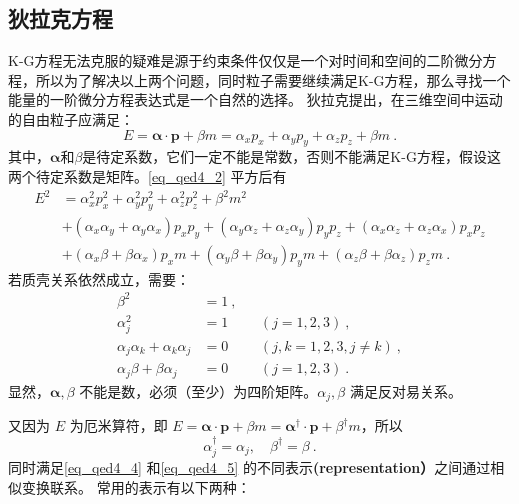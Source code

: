 \subsection{狄拉克方程}
K-G方程无法克服的疑难是源于约束条件仅仅是一个对时间和空间的二阶微分方程，所以为了解决以上两个问题，同时粒子需要继续满足K-G方程，那么寻找一个能量的一阶微分方程表达式是一个自然的选择。
狄拉克提出，在三维空间中运动的自由粒子应满足：
\begin{equation}\label{eq_qed4_2}
E=\boldsymbol{\alpha} \cdot \boldsymbol{p}+\beta m=\alpha_{x} p_{x}+\alpha_{y} p_{y}+\alpha_{z} p_{z}+\beta m~.
\end{equation}
其中，$\boldsymbol {\alpha}$和$\beta$是待定系数，它们一定不能是常数，否则不能满足K-G方程，假设这两个待定系数是矩阵。\autoref{eq_qed4_2} 平方后有
\begin{equation}\label{eq_qed4_3}
\begin{aligned}
E^{2} &=\alpha_{x}^{2} p_{x}^{2}+\alpha_{y}^{2} p_{y}^{2}+\alpha_{z}^{2} p_{z}^{2}+\beta^{2} m^{2} \\
&+\left(\alpha_{x} \alpha_{y}+\alpha_{y} \alpha_{x}\right) p_{x} p_{y}+\left(\alpha_{y} \alpha_{z}+\alpha_{z} \alpha_{y}\right) p_{y} p_{z}+\left(\alpha_{x} \alpha_{z}+\alpha_{z} \alpha_{x}\right) p_{x} p_{z} \\
&+\left(\alpha_{x} \beta+\beta \alpha_{x}\right) p_{x} m+\left(\alpha_{y} \beta+\beta \alpha_{y}\right) p_{y} m+\left(\alpha_{z} \beta+\beta \alpha_{z}\right) p_{z} m~.
\end{aligned}
\end{equation}
若质壳关系依然成立，需要：
\begin{equation}\label{eq_qed4_4}
\begin{aligned}
\beta^{2} &=1~, & & \\
\alpha_j^{2} &=1 & &(j=1,2,3) ~,\\
\alpha_j \alpha_k+\alpha_k \alpha_j &=0 & &(j, k=1,2,3, j \neq k) ~,\\
\alpha_j \beta+\beta \alpha_j &=0 & &(j=1,2,3)~.
\end{aligned}
\end{equation}
显然，$\boldsymbol{\alpha}, \beta$ 不能是数，必须（至少）为四阶矩阵。$\alpha_j, \beta$ 满足反对易关系。

又因为 $E$ 为厄米算符，即 $E=\boldsymbol{\alpha} \cdot \boldsymbol{p}+\beta m=\boldsymbol{\alpha}^\dagger \cdot \boldsymbol{p}+\beta^\dagger m$，所以
\begin{equation}\label{eq_qed4_5}
\alpha_j^{\dagger}=\alpha_j, \quad \beta^{\dagger}=\beta~.
\end{equation}
同时满足\autoref{eq_qed4_4} 和\autoref{eq_qed4_5} 的不同表示\textbf{(representation）}之间通过相似变换联系。
常用的表示有以下两种：

